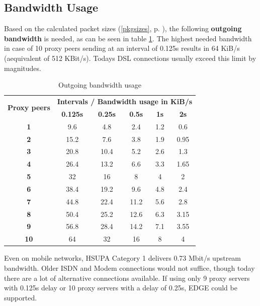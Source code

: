 \subsection{Bandwidth Usage}
Based on the calculated packet sizes (\ref{pkgsizes}, p. \pageref{pkgsizes}), 
the following \textbf{outgoing bandwidth}
is needed, as can be seen in table \ref{bandwidth}.
The highest needed bandwidth
in case of 10 proxy peers sending at an interval of 0.125s results in 64 KiB/s
(aequivalent of 512 KBit/s).
 Todays DSL connections usually exceed this limit by magnitudes.
\begin{longtable}{|c|c|c|c|c|c|}
\caption{Outgoing bandwidth usage}
\label{bandwidth}\\
\hline
\multirow{2}{*}{\textbf{Proxy peers}} & \multicolumn{5}{|l|}{\textbf{Intervals / Bandwidth usage in KiB/s}} \\
& \textbf{0.125s} & \textbf{0.25s} & \textbf{0.5s} & \textbf{1s} & \textbf{2s}\\
\hline
\textbf{1} & 9.6 & 4.8 & 2.4 & 1.2 & 0.6\\
\hline
\textbf{2} & 15.2 & 7.6 & 3.8 & 1.9 & 0.95\\
\hline
\textbf{3} & 20.8 & 10.4 & 5.2 & 2.6 & 1.3\\
\hline
\textbf{4} & 26.4 & 13.2 & 6.6 & 3.3 & 1.65\\
\hline
\textbf{5} & 32 & 16 & 8 & 4 & 2\\
\hline
\textbf{6} & 38.4 & 19.2 & 9.6 & 4.8 & 2.4\\
\hline
\textbf{7} & 44.8 & 22.4 & 11.2 & 5.6 & 2.8\\
\hline
\textbf{8} & 50.4 & 25.2 & 12.6 & 6.3 & 3.15\\
\hline
\textbf{9} & 56.8 & 28.4 & 14.2 & 7.1 & 3.55\\
\hline
\textbf{10} & 64 & 32 & 16 & 8 & 4\\
\hline
\end{longtable}
Even on mobile networks, HSUPA Category 1 delivers 0.73 Mbit/s upstream bandwidth.
Older ISDN and Modem connections would not suffice, though
today there are a lot of alternative connections
 available.\cite{wiki:bitrates}
If using only 9 proxy servers with 0.125s delay or
10 proxy servers with a delay of 0.25s, EDGE could be supported.

